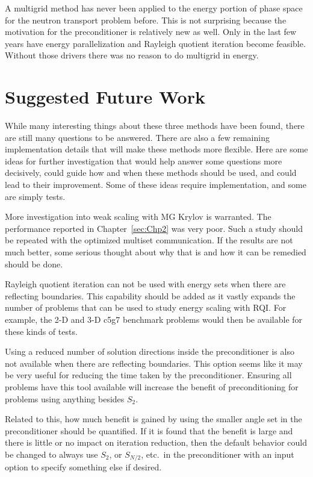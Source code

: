 A multigrid method has never been applied to the energy portion of phase space for the neutron transport problem before. This is not surprising because the motivation for the preconditioner is relatively new as well. Only in the last few years have energy parallelization and Rayleigh quotient iteration become feasible. Without those drivers there was no reason to do multigrid in energy.

\section{Suggested Future Work}
While many interesting things about these three methods have been found, there are still many questions to be answered. There are also a few remaining implementation details that will make these methods more flexible. Here are some ideas for further investigation that would help answer some questions more decisively, could guide how and when these methods should be used, and could lead to their improvement. Some of these ideas require implementation, and some are simply tests.

More investigation into weak scaling with MG Krylov is warranted. The performance reported in Chapter~\ref{sec:Chp2} was very poor. Such a study should be repeated with the optimized multiset communication. If the results are not much better, some serious thought about why that is and how it can be remedied should be done. 

Rayleigh quotient iteration can not be used with energy sets when there are reflecting boundaries. This capability should be added as it vastly expands the number of problems that can be used to study energy scaling with RQI. For example, the 2-D and 3-D c5g7 benchmark problems would then be available for these kinds of tests. 

Using a reduced number of solution directions inside the preconditioner is also not available when there are reflecting boundaries. This option seems like it may be very useful for reducing the time taken by the preconditioner. Ensuring all problems have this tool available will increase the benefit of preconditioning for problems using anything besides $S_{2}$.

Related to this, how much benefit is gained by using the smaller angle set in the preconditioner should be quantified. If it is found that the benefit is large and there is little or no impact on iteration reduction, then the default behavior could be changed to always use $S_{2}$, or $S_{N/2}$, etc.\ in the preconditioner with an input option to specify something else if desired. 

